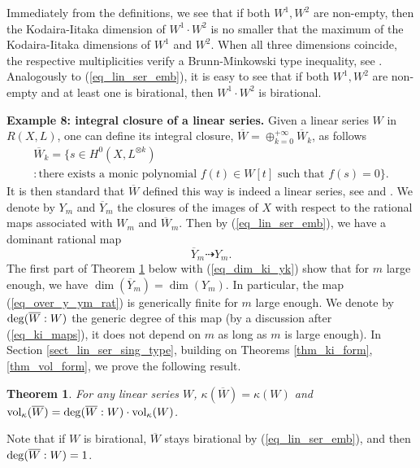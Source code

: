 \documentclass[12pt]{article}
\numberwithin{equation}{section}
\theoremstyle{theorem}
\newtheorem{thm}{Theorem}[section]
\theoremstyle{definition}
\theoremstyle{remark}
\begin{document}
	Immediately from the definitions, we see that if both $W^1, W^2$ are non-empty, then the Kodaira-Iitaka dimension of $W^1 \cdot W^2$ is no smaller that the maximum of the Kodaira-Iitaka dimensions of $W^1$ and $W^2$.
	When all three dimensions coincide, the respective multiplicities verify a Brunn-Minkowski type inequality, see \cite[Theorem 2.33]{KavehKhov}.
	Analogously to (\ref{eq_lin_ser_emb}), it is easy to see that if both $W^1, W^2$ are non-empty and at least one is birational, then $W^1 \cdot W^2$ is birational.
	\par 
	\textbf{Example 8: integral closure of a linear series.}
	Given a linear series $W$ in $R(X, L)$, one can define its integral closure, $\overline{W} = \oplus_{k = 0}^{+\infty} \overline{W}_k$, as follows
	\begin{multline}
		\overline{W}_k = \Big\{ s \in H^0(X, L^{\otimes k}) 
		\\
		: \text{there exists a monic polynomial } f(t) \in W[t] \text{ such that } f(s) = 0 
		\Big\}.
	\end{multline}
	It is then standard that $\overline{W}$ defined this way is indeed a linear series, see \cite[Theorem 4.2]{EisenbudBook} and \cite[Theorem 2.32]{SwanHuneke}.
	We denote by $Y_m$ and $\overline{Y}_m$ the closures of the images of $X$ with respect to the rational maps associated with $W_m$ and $\overline{W}_m$.
	Then by (\ref{eq_lin_ser_emb}), we have a dominant rational map
	\begin{equation}\label{eq_over_y_ym_rat}
		\overline{Y}_m \dashrightarrow Y_m.
	\end{equation}
	The first part of Theorem \ref{thm_integ_closuse} below with (\ref{eq_dim_ki_yk}) show that for $m$ large enough, we have $\dim(\overline{Y}_m) = \dim(Y_m)$.
	In particular, the map (\ref{eq_over_y_ym_rat}) is generically finite for $m$ large enough.
	We denote by ${\rm{deg}}(\overline{W} : W)$ the generic degree of this map (by a discussion after (\ref{eq_ki_maps}), it does not depend on $m$ as long as $m$ is large enough).
	In Section \ref{sect_lin_ser_sing_type}, building on Theorems \ref{thm_ki_form}, \ref{thm_vol_form}, we prove the following result.
	\begin{thm}\label{thm_integ_closuse}
		For any linear series $W$, $\kappa(\overline{W}) = \kappa(W)$ and ${\rm{vol}}_{\kappa}(\overline{W}) = {\rm{deg}}(\overline{W} : W) \cdot {\rm{vol}}_{\kappa}(W)$.
	\end{thm}
	\par 
	Note that if $W$ is birational, $\overline{W}$ stays birational by (\ref{eq_lin_ser_emb}), and then ${\rm{deg}}(\overline{W} : W) = 1$. 
\end{document}
